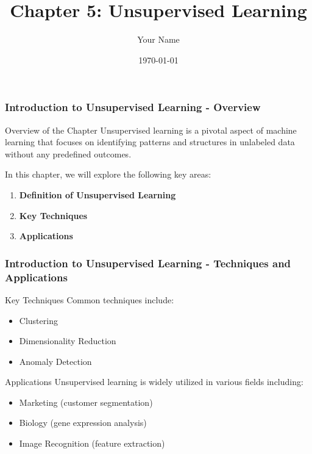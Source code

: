 \documentclass{beamer}
\title{Chapter 5: Unsupervised Learning}
\author{Your Name}
\institute{Your Institution}
\date{\today}
\begin{document}
\frame{\titlepage}

\begin{frame}[fragile]
    \frametitle{Introduction to Unsupervised Learning - Overview}
    \begin{block}{Overview of the Chapter}
        Unsupervised learning is a pivotal aspect of machine learning that focuses on identifying patterns and structures in unlabeled data without any predefined outcomes. 
    \end{block}

    In this chapter, we will explore the following key areas:
    \begin{enumerate}
        \item \textbf{Definition of Unsupervised Learning}
        \item \textbf{Key Techniques}
        \item \textbf{Applications}
    \end{enumerate}
\end{frame}

\begin{frame}[fragile]
    \frametitle{Introduction to Unsupervised Learning - Techniques and Applications}
    \begin{block}{Key Techniques}
        Common techniques include:
        \begin{itemize}
            \item Clustering
            \item Dimensionality Reduction
            \item Anomaly Detection
        \end{itemize}
    \end{block}

    \begin{block}{Applications}
        Unsupervised learning is widely utilized in various fields including:
        \begin{itemize}
            \item Marketing (customer segmentation)
            \item Biology (gene expression analysis)
            \item Image Recognition (feature extraction)
        \end{itemize}
    \end{block}
\end{frame}
\end{document}
